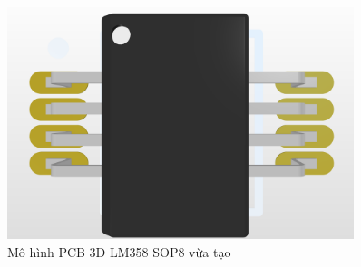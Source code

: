         \begin{figure}[H]
            \centering
            \includegraphics[width=0.9\textwidth]{pictures/ch3.11b.png}
            \caption{Mô hình PCB 3D LM358 SOP8 vừa tạo}
        \end{figure}
        \cleardoublepage
